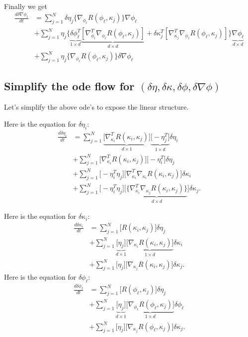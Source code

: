\documentclass[noinfoline]{imsart}
\begin{document}
{\begin{align}
\end{align}
Finally we get
\begin{align}
\frac{d\delta\nabla\phi_\ell}{dt}
&= \sum_{j=1}^N  \delta\eta_j  \{ \nabla_{\phi_\ell}R(\phi_\ell,\kappa_j)\} \nabla{\phi}_\ell   \\
&+ \sum_{j=1}^N \eta_j \bigl\{ \underbrace{\delta\phi^T_\ell}_{1\times d} \underbrace{[\nabla_{\phi_\ell}^T\nabla_{\phi_\ell}R(\phi_\ell,\kappa_j)]}_{d\times d} +   \delta\kappa_j^T [\nabla_{\kappa_j}^T\nabla_{\phi_\ell}R(\phi_\ell,\kappa_j)]     \bigr\} \underbrace{\nabla {\phi_\ell}}_{d\times d}  \\
&+ \sum_{j=1}^N \eta_j \{ \nabla_{\phi_\ell}R(\phi_\ell,\kappa_j)\} \delta\nabla {\phi}_\ell
\end{align}

\subsection{Simplify the ode flow for $(\delta \eta,\delta \kappa, \delta \phi, \delta \nabla \phi)$}
\label{simplifiedODE}
Let's simplify the above ode's to expose the linear structure.

Here is the equation for $\delta \eta_i$:
\begin{align*}
\frac{d\delta \eta_i}{dt} &= \sum_{j=1}^N \underbrace{ \bigl[ \nabla^T_{\kappa_i}R(\kappa_i,\kappa_j)\bigr]}_{d\times 1} \underbrace{\bigl[-  \eta_j^T   \bigr]}_{1\times d}\delta\eta_i  \\
&+ \sum_{j=1}^N  \bigl[\nabla^T_{\kappa_i}R(\kappa_i,\kappa_j)\bigr] \bigl[- \eta^T_i     \bigr]\delta\eta_j\\
&+\sum_{j=1}^N \bigl[-\eta^T_i \eta_j\bigr]  \bigl[  \nabla^T_{\kappa_i}\nabla_{\kappa_i}R(\kappa_i,\kappa_j)  \bigr]\delta\kappa_i \\
&+\sum_{j=1}^N {\bigl[-\eta^T_i \eta_j\bigr]}  \bigl[   \underbrace{ \{\nabla^T_{\kappa_i}\nabla_{\kappa_j}R(\kappa_i,\kappa_j)\} }_{d\times d}\bigr]\delta\kappa_j .
\end{align*}


Here is the equation for $\delta \kappa_i$:
\begin{align*}
\frac{d\delta\kappa_i}{dt}&=\sum_{j=1}^N  \bigl[R(\kappa_i,\kappa_j)\bigr] \delta\eta_j  \\
&+\sum_{j=1}^N \underbrace{\bigl[\eta_j\bigr]}_{d\times 1} \underbrace{\bigl[ \nabla_{\kappa_i} R(\kappa_i,\kappa_j)\bigr]}_{1\times d} \delta\kappa_i \\
&+\sum_{j=1}^N \bigl[\eta_j\bigr] \bigl[ \nabla_{\kappa_j} R(\kappa_i,\kappa_j) \bigr] \delta\kappa_j.
\end{align*}
Here is the equation for $\delta \phi_\ell$:
\begin{align}
\frac{d\delta\phi_\ell}{dt} &= \sum_{j=1}^N \bigl[R(\phi_\ell,\kappa_j)\bigr] \delta\eta_j  \\
&+ \sum_{j=1}^N \underbrace{\bigl[\eta_j\bigr]}_{d\times 1} \underbrace{\bigl[ \nabla_{\phi_\ell}R(\phi_\ell,\kappa_j)\bigr]}_{1\times d}  \delta\phi_\ell \\
& + \sum_{j=1}^N \bigl[\eta_j\bigr]\bigl[   \nabla_{\kappa_j}R(\phi_\ell,\kappa_j) \bigr] \delta\kappa_j .
\end{align}

}
\end{document}
